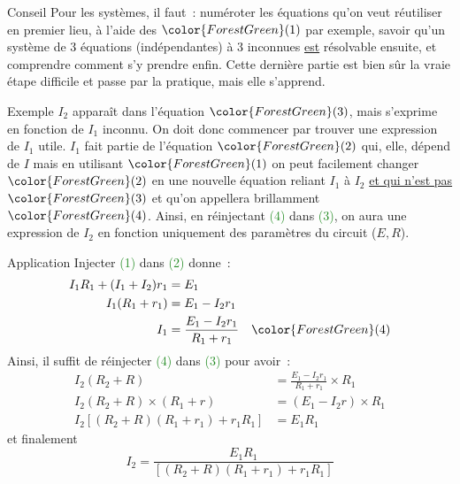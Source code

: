 \documentclass[a4paper, 12pt, final, garamond]{book}
\begin{document}
\begin{tcbraster}[raster columns=2, raster equal height=rows]
    \begin{NCimpo}{Conseil}
        Pour les systèmes, il faut~: numéroter les équations qu'on veut
        réutiliser en premier lieu, à l'aide des $\color{ForestGreen}(1)$ par
        exemple, savoir qu'un système de 3 équations (indépendantes) à 3
        inconnues \underline{est} résolvable ensuite, et comprendre comment s'y
        prendre enfin. Cette dernière partie est bien sûr la vraie étape
        difficile et passe par la pratique, mais elle s'apprend.
    \end{NCimpo}
    \begin{NCrema}{Exemple}
        $I_2$ apparaît dans l'équation $\color{ForestGreen}(3)$, mais s'exprime
        en fonction de $I_1$ inconnu. On doit donc commencer par trouver une
        expression de $I_1$ utile. $I_1$ fait partie de l'équation
        $\color{ForestGreen}(2)$ qui, elle, dépend de $I$ mais en utilisant
        $\color{ForestGreen}(1)$ on peut facilement changer
        $\color{ForestGreen}(2)$ en une nouvelle équation reliant $I_1$ à $I_2$
        \underline{et qui n'est pas $\color{ForestGreen}(3)$} et qu'on
        appellera brillamment $\color{ForestGreen}(4)$. Ainsi, en réinjectant
        \textcolor{ForestGreen}{(4)} dans \textcolor{ForestGreen}{(3)}, on aura
        une expression de $I_2$ en fonction uniquement des paramètres du circuit
        ($E, R$).
    \end{NCrema}
\end{tcbraster}

\begin{center}
    \begin{NCexem}[sidebyside, righthand ratio=.55]{Application}
        Injecter \textcolor{ForestGreen}{(1)} dans \textcolor{ForestGreen}{(2)}
        donne~:
        \begin{align*}
            I_1R_1 + (I_1+I_2)r_1 &= E_1\\
            I_1(R_1+r_1) &= E_1-I_2r_1\\
            I_1 &= \frac{E_1 - I_2r_1}{R_1 + r_1} \quad \color{ForestGreen}(4)
        \end{align*}
        Ainsi, il suffit de réinjecter \textcolor{ForestGreen}{(4)} dans
        \textcolor{ForestGreen}{(3)} pour avoir~:
        \tcblower
        \begin{align*}
            I_2(R_2+R) &= \frac{E_1 - I_2r_1}{R_1 + r_1}\times R_1\\
            I_2(R_2+R)\times(R_1+r) &= (E_1-I_2r)\times R_1\\
            I_2 \left[ (R_2+R)(R_1+r_1)+r_1R_1 \right] &= E_1R_1
        \end{align*}
        et finalement
        \[\boxed{I_2 = \frac{E_1R_1}{\left[ (R_2+R)(R_1+r_1)+r_1R_1 \right]}}\]
    \end{NCexem}
\end{center}
\end{document}
